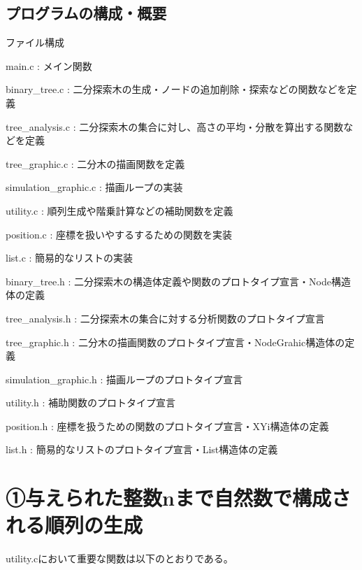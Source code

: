 \documentclass{ltjsarticle}
\begin{document}
\subsection{プログラムの構成・概要}

ファイル構成

\begin{list}{}{\leftmargin=1em}
\item main.c : メイン関数
\item binary\_tree.c : 二分探索木の生成・ノードの追加削除・探索などの関数などを定義
\item tree\_analysis.c : 二分探索木の集合に対し、高さの平均・分散を算出する関数などを定義
\item tree\_graphic.c : 二分木の描画関数を定義
\item simulation\_graphic.c : 描画ループの実装
\item utility.c : 順列生成や階乗計算などの補助関数を定義
\item position.c : 座標を扱いやするするための関数を実装
\item list.c : 簡易的なリストの実装
\end{list}

\begin{list}{}{\leftmargin=1em}
\item binary\_tree.h : 二分探索木の構造体定義や関数のプロトタイプ宣言・Node構造体の定義
\item tree\_analysis.h : 二分探索木の集合に対する分析関数のプロトタイプ宣言
\item tree\_graphic.h : 二分木の描画関数のプロトタイプ宣言・NodeGrahic構造体の定義
\item simulation\_graphic.h : 描画ループのプロトタイプ宣言
\item utility.h : 補助関数のプロトタイプ宣言
\item position.h : 座標を扱うための関数のプロトタイプ宣言・XYi構造体の定義
\item list.h : 簡易的なリストのプロトタイプ宣言・List構造体の定義
\end{list}

\section{➀与えられた整数nまで自然数で構成される順列の生成}



utility.cにおいて重要な関数は以下のとおりである。
\end{document}
